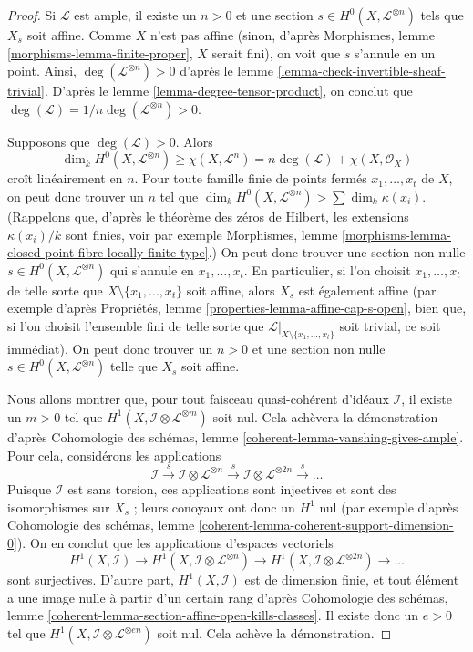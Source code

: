 \begin{proof}
Si $\mathcal{L}$ est ample, il existe un $n > 0$ et une section
$s \in H^0(X, \mathcal{L}^{\otimes n})$ tels que $X_s$ soit affine. Comme
$X$ n'est pas affine (sinon, d'après
Morphismes, lemme \ref{morphisms-lemma-finite-proper},
$X$ serait fini), on voit que $s$ s'annule en un point.
Ainsi, $\deg(\mathcal{L}^{\otimes n}) > 0$ d'après le
lemme \ref{lemma-check-invertible-sheaf-trivial}.
D'après le lemme \ref{lemma-degree-tensor-product},
on conclut que $\deg(\mathcal{L}) = 1/n\deg(\mathcal{L}^{\otimes n}) > 0$.

\medskip\noindent
Supposons que $\deg(\mathcal{L}) > 0$. Alors
$$
\dim_k H^0(X, \mathcal{L}^{\otimes n}) \geq \chi(X, \mathcal{L}^n)
= n\deg(\mathcal{L}) + \chi(X, \mathcal{O}_X)
$$
croît linéairement en $n$. Pour toute famille finie de points
fermés $x_1, \ldots, x_t$ de $X$, on peut donc trouver un $n$ tel que
$\dim_k H^0(X, \mathcal{L}^{\otimes n}) > \sum \dim_k \kappa(x_i)$.
(Rappelons que, d'après le théorème des zéros de Hilbert, les extensions
$\kappa(x_i)/k$ sont finies, voir par exemple
Morphismes, lemme \ref{morphisms-lemma-closed-point-fibre-locally-finite-type}.)
On peut donc trouver une section non nulle $s \in H^0(X, \mathcal{L}^{\otimes n})$
qui s'annule en $x_1, \ldots, x_t$. En particulier, si l'on choisit
$x_1, \ldots, x_t$ de telle sorte que $X \setminus \{x_1, \ldots, x_t\}$
soit affine, alors $X_s$ est également affine
(par exemple d'après Propriétés, lemme \ref{properties-lemma-affine-cap-s-open},
bien que, si l'on choisit l'ensemble fini de telle sorte que
$\mathcal{L}|_{X \setminus \{x_1, \ldots, x_t\}}$ soit trivial,
ce soit immédiat). On peut donc trouver un $n > 0$
et une section non nulle $s \in H^0(X, \mathcal{L}^{\otimes n})$ telle
que $X_s$ soit affine.

\medskip\noindent
Nous allons montrer que, pour tout faisceau quasi-cohérent d'idéaux $\mathcal{I}$,
il existe un $m > 0$ tel que
$H^1(X, \mathcal{I} \otimes \mathcal{L}^{\otimes m})$ soit nul.
Cela achèvera la démonstration d'après
Cohomologie des schémas, lemme \ref{coherent-lemma-vanshing-gives-ample}.
Pour cela, considérons les applications
$$
\mathcal{I} \xrightarrow{s}
\mathcal{I} \otimes \mathcal{L}^{\otimes n} \xrightarrow{s}
\mathcal{I} \otimes \mathcal{L}^{\otimes 2n} \xrightarrow{s} \ldots
$$
Puisque $\mathcal{I}$ est sans torsion, ces applications sont injectives et
sont des isomorphismes sur $X_s$ ; leurs conoyaux ont donc un $H^1$ nul
(par exemple d'après Cohomologie des schémas, lemme
\ref{coherent-lemma-coherent-support-dimension-0}).
On en conclut que les applications d'espaces vectoriels
$$
H^1(X, \mathcal{I}) \to
H^1(X, \mathcal{I} \otimes \mathcal{L}^{\otimes n}) \to
H^1(X, \mathcal{I} \otimes \mathcal{L}^{\otimes 2n}) \to \ldots
$$
sont surjectives. D'autre part, $H^1(X, \mathcal{I})$ est de dimension
finie, et tout élément a une image nulle à partir d'un certain rang d'après
Cohomologie des schémas, lemme
\ref{coherent-lemma-section-affine-open-kills-classes}.
Il existe donc un $e > 0$ tel que
$H^1(X, \mathcal{I} \otimes \mathcal{L}^{\otimes en})$ soit nul.
Cela achève la démonstration.
\end{proof}

